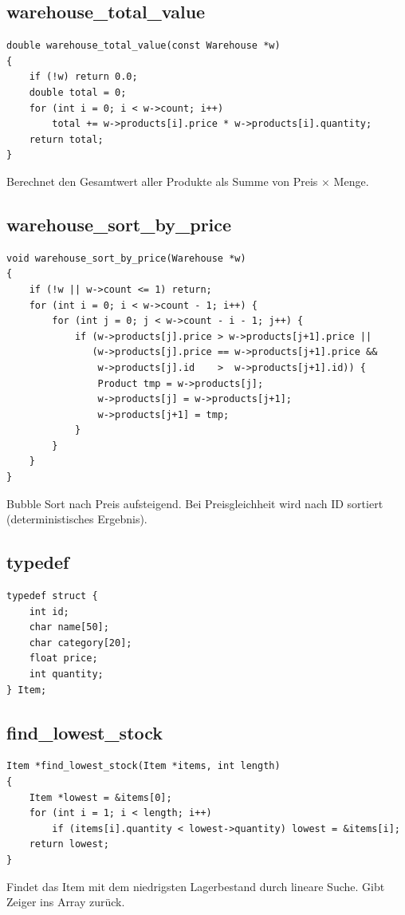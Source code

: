 \documentclass[10pt, a4paper]{article}
\begin{document}
\subsection{warehouse\_total\_value}
\begin{lstlisting}
double warehouse_total_value(const Warehouse *w)
{
    if (!w) return 0.0;
    double total = 0;
    for (int i = 0; i < w->count; i++)
        total += w->products[i].price * w->products[i].quantity;
    return total;
}
\end{lstlisting}
Berechnet den Gesamtwert aller Produkte als Summe von Preis $\times$ Menge.

\subsection{warehouse\_sort\_by\_price}
\begin{lstlisting}
void warehouse_sort_by_price(Warehouse *w)
{
    if (!w || w->count <= 1) return;
    for (int i = 0; i < w->count - 1; i++) {
        for (int j = 0; j < w->count - i - 1; j++) {
            if (w->products[j].price > w->products[j+1].price ||
               (w->products[j].price == w->products[j+1].price &&
                w->products[j].id    >  w->products[j+1].id)) {
                Product tmp = w->products[j];
                w->products[j] = w->products[j+1];
                w->products[j+1] = tmp;
            }
        }
    }
}
\end{lstlisting}
Bubble Sort nach Preis aufsteigend. Bei Preisgleichheit wird nach ID sortiert (deterministisches Ergebnis).

\subsection{typedef}
\begin{lstlisting}
typedef struct {
    int id;
    char name[50];
    char category[20];
    float price;
    int quantity;
} Item;
\end{lstlisting}

\subsection{find\_lowest\_stock}
\begin{lstlisting}
Item *find_lowest_stock(Item *items, int length)
{
    Item *lowest = &items[0];
    for (int i = 1; i < length; i++)
        if (items[i].quantity < lowest->quantity) lowest = &items[i];
    return lowest;
}
\end{lstlisting}
Findet das Item mit dem niedrigsten Lagerbestand durch lineare Suche. Gibt Zeiger ins Array zur\"uck.
\end{document}
